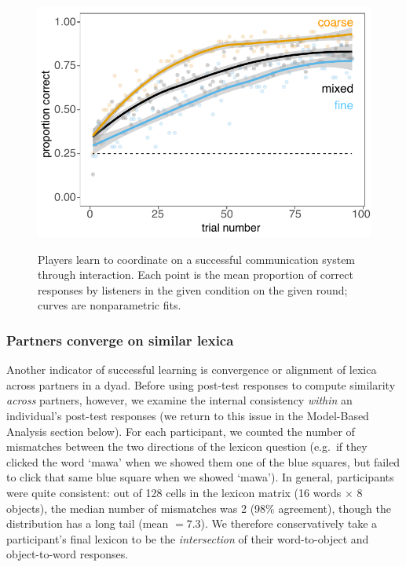 \documentclass[10pt,letterpaper]{article}
\begin{document}
\begin{figure}[t]
\begin{center}
{\includegraphics[scale=0.63]{accuracyByCondition_edited.pdf}}
{\caption{{Players learn to coordinate on a successful communication system through interaction. Each point is the mean proportion of correct responses by listeners in the given condition on the given round; curves are nonparametric fits.  %
\label{fig:accuracy}}}}
\vspace{-.5cm}
\end{center}
\end{figure}

\subsubsection{Partners converge on similar lexica}

Another indicator of successful learning is convergence or alignment of lexica across partners in a dyad. Before using post-test responses to compute similarity \emph{across} partners, however, we examine the internal consistency \emph{within} an individual's post-test responses (we return to this issue in the Model-Based Analysis section below). For each participant, we counted the number of mismatches between the two directions of the lexicon question (e.g.\ if they clicked the word `mawa' when we showed them one of the blue squares, but failed to click that same blue square when we showed `mawa'). In general, participants were quite consistent: out of 128 cells in the lexicon matrix (16 words $\times$ 8 objects), the median number of mismatches was 2 (98\% agreement), though the distribution has a long tail (mean $= 7.3$). We therefore conservatively take a participant's final lexicon to be the \emph{intersection} of their word-to-object and object-to-word responses.
\end{document}
